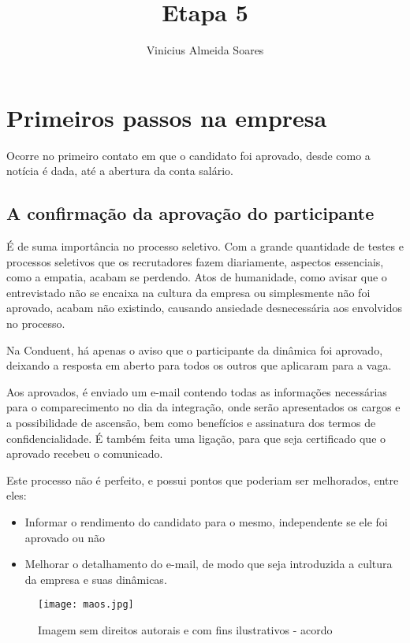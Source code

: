 \documentclass[12pt]{article}
\author{Vinicius Almeida Soares}
\title{Etapa 5}
\begin{document}
\maketitle

\section{Primeiros passos na empresa}
Ocorre no primeiro contato em que o candidato foi aprovado, desde como a notícia é dada, até a abertura da conta salário.


\subsection{A confirmação da aprovação do participante}
É de suma importância no processo seletivo. Com a grande quantidade de testes e processos seletivos que os recrutadores fazem diariamente, aspectos essenciais, como a empatia, acabam se perdendo. Atos de humanidade, como avisar que o entrevistado não se encaixa na cultura da empresa ou simplesmente não foi aprovado, acabam não existindo, causando ansiedade desnecessária aos envolvidos no processo.

Na Conduent, há apenas o aviso que o participante da dinâmica foi aprovado, deixando a resposta em aberto para todos os outros que aplicaram para a vaga.

Aos aprovados, é enviado um e-mail contendo todas as informações necessárias para o comparecimento no dia da integração, onde serão apresentados os cargos e a possibilidade de ascensão, bem como benefícios e assinatura dos termos de confidencialidade. É também feita uma ligação, para que seja certificado que o aprovado recebeu o comunicado.

Este processo não é perfeito, e possui pontos que poderiam ser melhorados, entre eles:

\begin{itemize}
\item Informar o rendimento do candidato para o mesmo, independente se ele foi aprovado ou não
\item  Melhorar o detalhamento do e-mail, de modo que seja introduzida a cultura da empresa e suas dinâmicas.
\end{itemize}

\begin{figure}[h]
	\centering
	\texttt{[image: maos.jpg]}
	\caption{Imagem sem direitos autorais e com fins ilustrativos - acordo}
	\label{fig:mesh1}
\end{figure}
\end{document}
